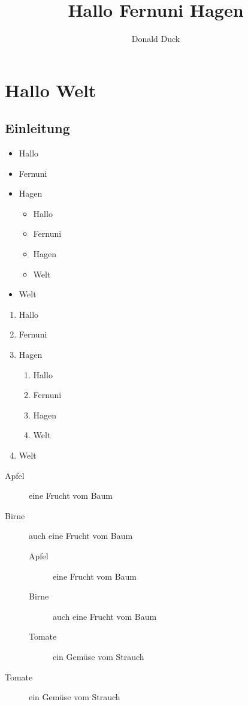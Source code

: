 \documentclass[12pt,ngerman,parskip=half]{scrreprt}
\author{Donald Duck}
\title{Hallo Fernuni Hagen}
\begin{document}
\maketitle

\tableofcontents

\chapter{Hallo Welt}

\section{Einleitung}

\blindtext[1] 

\begin{itemize}
\item Hallo
\item Fernuni
\item Hagen
\begin{itemize}
\item Hallo
\item Fernuni
\item Hagen
\item Welt
\end{itemize}
\item Welt
\end{itemize}

\begin{enumerate}
\item Hallo
\item Fernuni
\item Hagen
\begin{enumerate}
\item Hallo
\item Fernuni
\item Hagen
\item Welt
\end{enumerate}
\item Welt
\end{enumerate}

\begin{description}
\item[Apfel] eine Frucht vom Baum
\item[Birne] auch eine Frucht vom Baum

\begin{description}
\item[Apfel] eine Frucht vom Baum
\item[Birne] auch eine Frucht vom Baum
\item[Tomate] ein Gemüse vom Strauch
\end{description}

\item[Tomate] ein Gemüse vom Strauch
\end{description}
\end{document}
